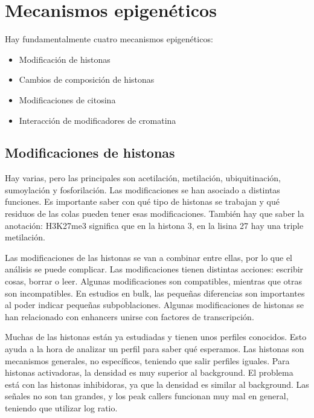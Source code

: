 \section{Mecanismos epigenéticos}
Hay fundamentalmente cuatro mecanismos epigenéticos:
\begin{itemize}
\item Modificación de histonas
\item Cambios de composición de histonas
\item Modificaciones de citosina
\item Interacción de modificadores de cromatina
\end{itemize}

\subsection{Modificaciones de histonas}
Hay varias, pero las principales son acetilación, metilación, ubiquitinación, sumoylación y fosforilación. Las modificaciones se han asociado a distintas funciones. Es importante saber con qué tipo de histonas se trabajan y qué residuos de las colas pueden tener esas modificaciones. También hay que saber la anotación: H3K27me3 significa que en la histona 3, en la lisina 27 hay una triple metilación. 

Las modificaciones de las histonas se van a combinar entre ellas, por lo que el análisis se puede complicar. Las modificaciones tienen distintas acciones: escribir cosas, borrar o leer. Algunas modificaciones son compatibles, mientras que otras son incompatibles. En estudios en bulk, las pequeñas diferencias son importantes al poder indicar pequeñas subpoblaciones. Algunas modificaciones de histonas se han relacionado con enhancers unirse con factores de transcripción. 

Muchas de las histonas están ya estudiadas y tienen unos perfiles conocidos. Esto ayuda a la hora de analizar un perfil para saber qué esperamos. Las histonas son mecanismos generales, no específicos, teniendo que salir perfiles iguales. Para histonas activadoras, la densidad es muy superior al background. El problema está con las histonas inhibidoras, ya que la densidad es similar al background. Las señales no son tan grandes, y los peak callers funcionan muy mal en general, teniendo que utilizar log ratio. 

